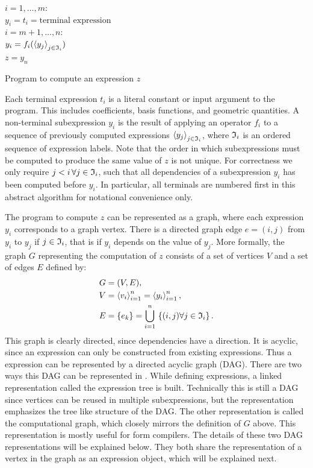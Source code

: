 \begin{algorithm}
\afor $i = 1, \ldots, m$:\\
\tab $ y_i =  t_i = \mbox{terminal expression}$ \\
\afor $i = m+1, \ldots, n$:\\
\tab $ y_i =  f_i(\left\langle{y_j}\right\rangle_{j\in\mathfrak{I}_i})$ \\
$z = y_n$
\caption{Program to compute an expression $z$}
\label{ufl:alg:program}
\end{algorithm}

Each terminal expression $t_i$ is a literal constant or input argument
to the program. This includes coefficients, basis functions, and
geometric quantities.  A non-terminal subexpression $y_i$ is the
result of applying an operator $f_i$ to a sequence of previously
computed expressions $\left\langle{y_j}\right\rangle_{j\in\mathfrak{I}_i}$, where $\mathfrak{I}_i$ is an
ordered sequence of expression labels.  Note that the order in which
subexpressions must be computed to produce the same value of $z$ is
not unique.  For correctness we only require $j < i \, \forall j \in
\mathfrak{I}_i$, such that all dependencies of a subexpression $y_i$ has been
computed before $y_i$.  In particular, all terminals are numbered
first in this abstract algorithm for notational convenience only.

The program to compute $z$ can be represented as a graph, where each
expression $y_i$ corresponds to a graph vertex. There is a directed
graph edge $e = (i, j)$ from $y_i$ to $y_j$ if $j \in \mathfrak{I}_i$, that is
if $y_i$ depends on the value of $y_j$. More formally, the graph $G$
representing the computation of $z$ consists of a set of vertices $V$
and a set of edges $E$ defined by:
\begin{align}
G &= (V, E), \label{ufl:eq:G} \\
V &= \left\langle{v_i}\right\rangle_{i=1}^n = \left\langle{y_i}\right\rangle_{i=1}^n, \label{ufl:eq:V} \\
E &= \{ e_k \} = \bigcup_{i=1}^n \, \left\{ (i, j) \forall j \in \mathfrak{I}_i \right\} . \label{ufl:eq:E}
\end{align}
This graph is clearly directed, since dependencies have a direction.
It is acyclic, since an expression can only be constructed from
existing expressions.  Thus a \ufl{} expression can be represented by
a directed acyclic graph (DAG).  There are two ways this DAG can be
represented in \ufl{}. While defining expressions, a linked
representation called the expression tree is built. Technically this
is still a DAG since vertices can be reused in multiple
subexpressions, but the representation emphasizes the tree like
structure of the DAG. The other representation is called the
computational graph, which closely mirrors the definition of $G$
above. This representation is mostly useful for form compilers.  The
details of these two DAG representations will be explained below.
They both share the representation of a vertex in the graph as an
expression object, which will be explained next.

